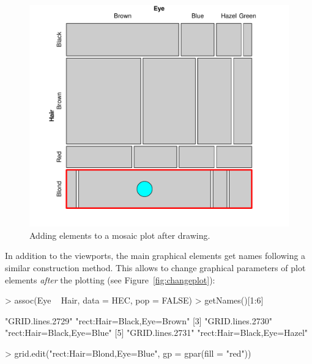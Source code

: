 \documentclass{Z}
\begin{document}
\begin{figure}[h]
\begin{center}
\includegraphics{strucplot-viewportnamesfig}
\caption{Adding elements to a mosaic plot after drawing.}
\label{fig:afterplot}
\end{center}
\end{figure}

In addition to the viewports, the main graphical elements get names
following a similar construction method. This allows to change
graphical parameters of plot elements \emph{after} 
the plotting (see Figure~\ref{fig:changeplot}):

\begin{Schunk}
\begin{Sinput}
> assoc(Eye ~ Hair, data = HEC, pop = FALSE)
> getNames()[1:6]
\end{Sinput}
\begin{Soutput}
[1] "GRID.lines.2729"           "rect:Hair=Black,Eye=Brown"
[3] "GRID.lines.2730"           "rect:Hair=Black,Eye=Blue" 
[5] "GRID.lines.2731"           "rect:Hair=Black,Eye=Hazel"
\end{Soutput}
\begin{Sinput}
> grid.edit("rect:Hair=Blond,Eye=Blue", gp = gpar(fill = "red"))
\end{Sinput}
\end{Schunk}
\end{document}
